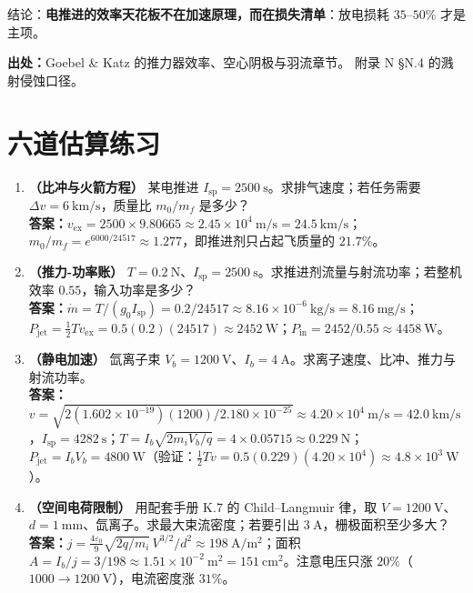 结论：\textbf{电推进的效率天花板不在加速原理，而在损失清单}：放电损耗 $35$--$50\%$ 才是主项。

{\footnotesize
\textbf{出处：}Goebel \& Katz 的推力器效率、空心阴极与羽流章节。
附录 N \S N.4 的溅射侵蚀口径。
}


\section{六道估算练习}


\begin{enumerate}
\item \textbf{（比冲与火箭方程）} 某电推进 $I_{\mathrm{sp}}=2500\ \mathrm{s}$。求排气速度；若任务需要 $\Delta v=6\ \mathrm{km/s}$，质量比 $m_0/m_f$ 是多少？\\
\textbf{答案：}$v_{\mathrm{ex}}=2500\times9.80665\approx2.45\times10^{4}\ \mathrm{m/s}=24.5\ \mathrm{km/s}$；$m_0/m_f=e^{6000/24517}\approx1.277$，即推进剂只占起飞质量的 $21.7\%$。

\item \textbf{（推力-功率账）} $T=0.2\ \mathrm{N}$、$I_{\mathrm{sp}}=2500\ \mathrm{s}$。求推进剂流量与射流功率；若整机效率 $0.55$，输入功率是多少？\\
\textbf{答案：}$\dot m=T/(g_0I_{\mathrm{sp}})=0.2/24517\approx8.16\times10^{-6}\ \mathrm{kg/s}=8.16\ \mathrm{mg/s}$；$P_{\mathrm{jet}}=\frac12Tv_{\mathrm{ex}}=0.5(0.2)(24517)\approx2452\ \mathrm{W}$；$P_{\mathrm{in}}=2452/0.55\approx4458\ \mathrm{W}$。

\item \textbf{（静电加速）} 氙离子束 $V_b=1200\ \mathrm{V}$、$I_b=4\ \mathrm{A}$。求离子速度、比冲、推力与射流功率。\\
\textbf{答案：}$v=\sqrt{2(1.602\times10^{-19})(1200)/2.180\times10^{-25}}\approx4.20\times10^{4}\ \mathrm{m/s}=42.0\ \mathrm{km/s}$，$I_{\mathrm{sp}}=4282\ \mathrm{s}$；$T=I_b\sqrt{2m_iV_b/q}=4\times0.05715\approx0.229\ \mathrm{N}$；$P_{\mathrm{jet}}=I_bV_b=4800\ \mathrm{W}$（验证：$\frac12Tv=0.5(0.229)(4.20\times10^{4})\approx4.8\times10^{3}\ \mathrm{W}$）。

\item \textbf{（空间电荷限制）} 用配套手册 K.7 的 Child--Langmuir 律，取 $V=1200\ \mathrm{V}$、$d=1\ \mathrm{mm}$、氙离子。求最大束流密度；若要引出 $3\ \mathrm{A}$，栅极面积至少多大？\\
\textbf{答案：}$j=\frac{4\varepsilon_0}{9}\sqrt{2q/m_i}\,V^{3/2}/d^2\approx198\ \mathrm{A/m^2}$；面积 $A=I_b/j=3/198\approx1.51\times10^{-2}\ \mathrm{m^2}=151\ \mathrm{cm^2}$。注意电压只涨 $20\%$（$1000\to1200\ \mathrm{V}$），电流密度涨 $31\%$。


\end{enumerate}
